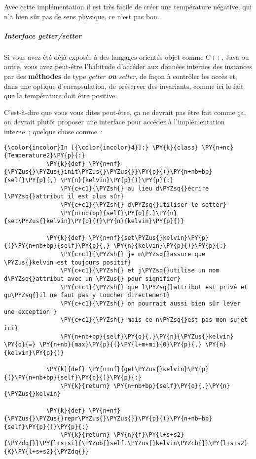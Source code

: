     Avec cette implémentation il est très facile de créer une température
négative, qui n'a bien sûr pas de sens physique, ce n'est pas bon.

    \hypertarget{interface-gettersetter}{%
\subparagraph{\texorpdfstring{Interface
\emph{getter/setter}}{Interface getter/setter}}\label{interface-gettersetter}}

    Si vous avez été déjà exposés à des langages orientés objet comme C++,
Java ou autre, vous avez peut-être l'habitude d'accéder aux données
internes des instances par des \textbf{méthodes} de type
\emph{getter\textbf{ ou }setter}, de façon à contrôler les accès et,
dans une optique d'encapsulation, de préserver des invariants, comme ici
le fait que la température doit être positive.

C'est-à-dire que vous vous dites peut-être, ça ne devrait pas être fait
comme ça, on devrait plutôt proposer une interface pour accéder à
l'implémentation interne~; quelque chose comme~:

    \begin{Verbatim}[commandchars=\\\{\},frame=single,framerule=0.3mm,rulecolor=\color{cellframecolor}]
{\color{incolor}In [{\color{incolor}4}]:} \PY{k}{class} \PY{n+nc}{Temperature2}\PY{p}{:}
            \PY{k}{def} \PY{n+nf}{\PYZus{}\PYZus{}init\PYZus{}\PYZus{}}\PY{p}{(}\PY{n+nb+bp}{self}\PY{p}{,} \PY{n}{kelvin}\PY{p}{)}\PY{p}{:}
                \PY{c+c1}{\PYZsh{} au lieu d\PYZsq{}écrire l\PYZsq{}attribut il est plus sûr}
                \PY{c+c1}{\PYZsh{} d\PYZsq{}utiliser le setter}
                \PY{n+nb+bp}{self}\PY{o}{.}\PY{n}{set\PYZus{}kelvin}\PY{p}{(}\PY{n}{kelvin}\PY{p}{)}
                
            \PY{k}{def} \PY{n+nf}{set\PYZus{}kelvin}\PY{p}{(}\PY{n+nb+bp}{self}\PY{p}{,} \PY{n}{kelvin}\PY{p}{)}\PY{p}{:}
                \PY{c+c1}{\PYZsh{} je m\PYZsq{}assure que \PYZus{}kelvin est toujours positif}
                \PY{c+c1}{\PYZsh{} et j\PYZsq{}utilise un nom d\PYZsq{}attribut avec un \PYZus{} pour signifier}
                \PY{c+c1}{\PYZsh{} que l\PYZsq{}attribut est privé et qu\PYZsq{}il ne faut pas y toucher directement}
                \PY{c+c1}{\PYZsh{} on pourrait aussi bien sûr lever une exception }
                \PY{c+c1}{\PYZsh{} mais ce n\PYZsq{}est pas mon sujet ici}
                \PY{n+nb+bp}{self}\PY{o}{.}\PY{n}{\PYZus{}kelvin} \PY{o}{=} \PY{n+nb}{max}\PY{p}{(}\PY{l+m+mi}{0}\PY{p}{,} \PY{n}{kelvin}\PY{p}{)}
                
            \PY{k}{def} \PY{n+nf}{get\PYZus{}kelvin}\PY{p}{(}\PY{n+nb+bp}{self}\PY{p}{)}\PY{p}{:}
                \PY{k}{return} \PY{n+nb+bp}{self}\PY{o}{.}\PY{n}{\PYZus{}kelvin}
                
            \PY{k}{def} \PY{n+nf}{\PYZus{}\PYZus{}repr\PYZus{}\PYZus{}}\PY{p}{(}\PY{n+nb+bp}{self}\PY{p}{)}\PY{p}{:}
                \PY{k}{return} \PY{n}{f}\PY{l+s+s2}{\PYZdq{}}\PY{l+s+si}{\PYZob{}self.\PYZus{}kelvin\PYZcb{}}\PY{l+s+s2}{K}\PY{l+s+s2}{\PYZdq{}}
\end{Verbatim}


